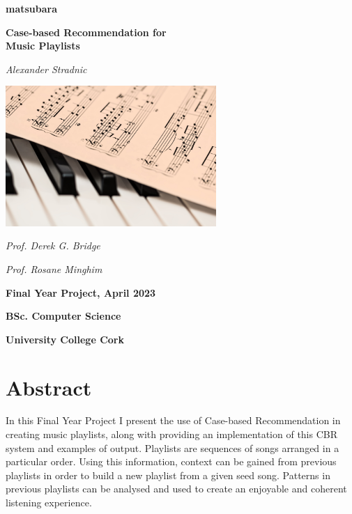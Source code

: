 \documentclass[a4paper, 12pt]{report}
\begin{document}
\begin{titlepage}
    \begin{center}
        \vspace*{1cm}

        \Large{
            \textbf{matsubara}
        
            \textbf{Case-based Recommendation for \\ Music Playlists}
        
            \vspace{0.5cm}
        
            \textit{Alexander Stradnic}
        
            \vspace{2cm}
        
            \includegraphics[width=0.6\textwidth]{piano.jpg}
        
            \vspace{2cm}
        
            \textit{Prof. Derek G. Bridge}

            \textit{Prof. Rosane Minghim}
        
            \vspace{0.5cm}
        
            \textbf{Final Year Project, April 2023}
        
            \textbf{BSc. Computer Science}

            \textbf{University College Cork}
        }
    \end{center}
\end{titlepage}

\chapter*{Abstract}
In this Final Year Project I present the use of Case-based Recommendation in creating music playlists, 
along with providing an implementation of this CBR system and examples of output.
Playlists are sequences of songs arranged in a particular order. Using this information, 
context can be gained from previous playlists in order to build a new playlist from a given seed song. 
Patterns in previous playlists can be analysed and used to create an enjoyable and coherent listening experience.
\end{document}
